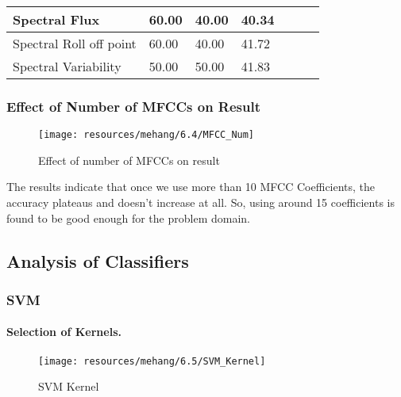 \begin{table}[h!]
\begin{center}
\begin{tabular}{|l|l|l|l|l|l|l|}
                        Spectral Flux
                        &
                        60.00
                        &
                        40.00
                        &
                        40.34
                        \\\hline

                        Spectral Roll off point
                        &
                        60.00
                        &
                        40.00
                        &
                        41.72
                        \\\hline

                        Spectral Variability
                        &
                        50.00
                        &
                        50.00
                        &
                        41.83
                        \\\hline

                 \end{tabular}
        \end{center}
\end{table}

\newpage
\newpage
\newpage
\subsubsection{Effect of Number of MFCCs on Result}
\begin{figure}[h!]
        \centering
        \texttt{[image: resources/mehang/6.4/MFCC\_Num]}
        \caption{Effect of number of MFCCs on result}
\end{figure}
The results indicate that once we use more than 10 MFCC Coefficients, the accuracy plateaus and doesn’t increase at all. So, using around 15 coefficients is found to be good enough for the problem domain.  

\newpage
\subsection{Analysis of Classifiers}
\subsubsection{SVM}
\paragraph{Selection of Kernels.}
\begin{figure}[h!]
        \centering
        \texttt{[image: resources/mehang/6.5/SVM\_Kernel]}
        \caption{SVM Kernel}
\end{figure}

